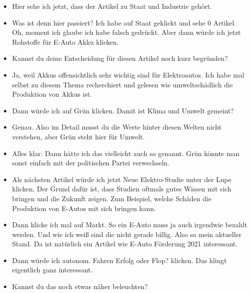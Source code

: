 {\begin{itemize}[]
                  Gut, dann gucken wir mal, ob sich ein E-Auto wirklich lohnt.
                  Also klicke ich mal auf den Artikel \flqq Stromverbrauch: So viel verbraucht ein E-Auto wirklich\frqq{}.
            \item {} Hier sehe ich jetzt, dass der Artikel zu Staat und Industrie gehört.
            \item {} Was ist denn hier passiert?
                  Ich habe auf Staat geklickt und sehe 0 Artikel.
                  Oh, moment ich glaube ich habe falsch gedrückt.
                  Aber dann würde ich jetzt \flqq Rohstoffe für E-Auto Akku\frqq{} klicken.
            \item {} Kannst du deine Entscheidung für diesen Artikel noch kurz begründen?
            \item {} Ja, weil Akkus offensichtlich sehr wichtig sind für Elektroautos.
                  Ich habe mal selbst zu diesem Thema recherchiert und gelesen wie umweltschädlich die Produktion von Akkus ist.
            \item {} Dann würde ich auf Grün klicken. Damit ist Klima und Umwelt gemeint?
            \item {} Genau. Also im Detail musst du die Werte hinter diesen Welten nicht verstehen, aber Grün steht hier für Umwelt.
            \item {} Alles klar. Dann hätte ich das vielleicht auch so genannt.
                  Grün könnte man sonst einfach mit der politischen Partei verwechseln.
            \item {} Als nächsten Artikel würde ich jetzt \flqq Neue Elektro-Studie unter der Lupe\frqq{} klicken.
                  Der Grund dafür ist, dass Studien oftmals gutes Wissen mit sich bringen und die Zukunft zeigen.
                  Zum Beispiel, welche Schäden die Produktion von E-Autos mit sich bringen kann.
            \item {} Dann klicke ich mal auf Markt.
                  So ein E-Auto muss ja auch irgendwie bezahlt werden.
                  Und wie ich weiß sind die nicht gerade billig.
                  Also so mein aktueller Stand.
                  Da ist natürlich ein Artikel wie \flqq E-Auto Förderung 2021\frqq{} interessant.
            \item {} Dann würde ich \flqq autonom. Fahren Erfolg oder Flop?\frqq{} klicken.
                  Das klingt eigentlich ganz interessant.
            \item {} Kannst du das noch etwas näher beleuchten?

\end{itemize}}
